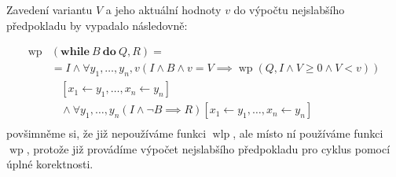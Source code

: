 Zavedení variantu $V$ a jeho aktuální hodnoty $v$ do výpočtu nejslabšího předpokladu by vypadalo následovně:

\begin{align*}
    \operatorname{wp}&(\textbf{while} \ B \ \textbf{do} \ Q, R) = \\
        & = I \land \forall y_1,\ldots,y_n,v \left( I \land B \land v = V \implies \operatorname{wp}(Q, I \land V \geq 0 \land V < v) \right) \\
        & \ \ \ \ [x_1 \leftarrow y_1, \ldots, x_n \leftarrow y_n] \\
        & \ \ \ \ \land \forall y_1,\ldots,y_n \left( I \land \neg B \implies R \right)[x_1 \leftarrow y_1, \ldots, x_n \leftarrow y_n] \\
\end{align*}
povšimněme si, že již nepoužíváme funkci $\operatorname{wlp}$, ale místo ní používáme funkci $\operatorname{wp}$,
protože již provádíme výpočet nejslabšího předpokladu pro cyklus pomocí úplné korektnosti.

